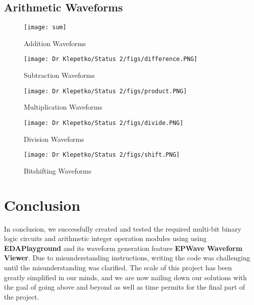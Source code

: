 \documentclass[12pt]{article}
\begin{document}
\subsection{Arithmetic Waveforms}
\begin{figure}[H]
    \centering
    \texttt{[image: sum]}
    \caption{Addition Waveforms}
    \label{fig:enter-label}
\end{figure}

\begin{figure}[H]
    \centering
    \texttt{[image: Dr Klepetko/Status 2/figs/difference.PNG]}
    \caption{Subtraction Waveforms}
    \label{fig:enter-label}
\end{figure}

\begin{figure}[H]
    \centering
    \texttt{[image: Dr Klepetko/Status 2/figs/product.PNG]}
    \caption{Multiplication Waveforms}
    \label{fig:enter-label}
\end{figure}

\begin{figure}[H]
    \centering
    \texttt{[image: Dr Klepetko/Status 2/figs/divide.PNG]}
    \caption{Division Waveforms}
    \label{fig:enter-label}
\end{figure}

\begin{figure}[H]
    \centering
    \texttt{[image: Dr Klepetko/Status 2/figs/shift.PNG]}
    \caption{Bitshifting Waveforms}
    \label{fig:enter-label}
\end{figure}

\newpage
\section{Conclusion}

In conclusion, we successfully created and tested the required multi-bit binary logic circuits and arithmetic integer operation modules using using \textbf{EDAPlayground} and its waveform generation feature \textbf{EPWave Waveform Viewer}. Due to misunderstanding instructions, writing the code was challenging until the misunderstanding was clarified. The scale of this project has been greatly simplified in our minds, and we are now nailing down our solutions with the goal of going above and beyond as well as time permits for the final part of the project.
\end{document}
